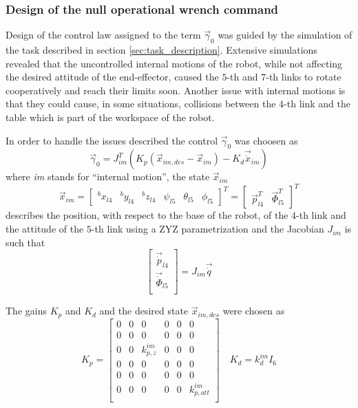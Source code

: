 \subsubsection{Design of the null operational wrench command}
Design of the control law assigned to the term $\vec{\gamma}_{0}$ was
guided by the simulation of the task described in section \ref{sec:task_description}. Extensive simulations
revealed that the uncontrolled internal motions of the robot, while not affecting the desired
attitude of the end-effector, caused the $5$-th and $7$-th links to rotate cooperatively and reach
their limits soon. Another issue with internal motions is that they could cause, in some situations,
collisions between the $4$-th link and the table which is part of the workspace of the robot.
\par
In order to handle the issues described the control $\vec{\gamma}_0$ was choosen as
\[
\vec{\gamma}_{0} = J_{im} ^{T} (K_p (\vec{x}_{im,des} - \vec{x}_{im} ) - K_d \vec{\dot{x}}_{im})
\]
where \emph{im} stands for ``internal motion'', the state $\vec{x}_{im}$
\[
\vec{x}_{im} =
\begin{bmatrix}
  {}^{b} x_{l4} & {}^{b} y_{l4} & {}^{b} z_{l4} & \psi_{l5} & \theta_{l5} & \phi_{l5}
\end{bmatrix}^{T} =
\begin{bmatrix}
  \vec{p}^{T}_{l4} & \vec{\Phi}^{T}_{l5}
\end{bmatrix}^{T}
\]
describes the position, with respect to the base of the robot, of the $4$-th link
and the attitude of the $5$-th link using a ZYZ parametrization and the Jacobian
$J_{im}$ is such that
\[
\begin{bmatrix}
  \vec{\dot{p}}_{l4} \\
  \vec{\dot{\Phi}}_{l5} \\
\end{bmatrix} =
J_{im} \vec{\dot{q}}
\]
\par
The gains $K_p$ and $K_d$ and the desired state $\vec{x}_{im,des}$ were chosen as
\[
K_p =
\begin{bmatrix}
  0 & 0 & 0 & 0 & 0 & 0\\
  0 & 0 & 0 & 0 & 0 & 0\\
  0 & 0 & k_{p,z}^{im} & 0 & 0 & 0\\
  0 & 0 & 0 & 0 & 0 & 0\\
  0 & 0 & 0 & 0 & 0 & 0\\
  0 & 0 & 0 & 0 & 0 & k_{p, att}^{im}\\
\end{bmatrix}
\quad
K_d = k_{d}^{im} I_{6}
\]
